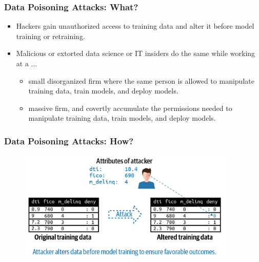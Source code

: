 \documentclass[11pt,
               aspectratio=169,
               hyperref={colorlinks}
               ]{beamer}
\begin{document}
			\begin{frame}
		
				\frametitle{Data Poisoning Attacks: \textbf{What?}}
				
				\begin{itemize}
					\item Hackers gain unauthorized access to training data and alter it before model training or retraining.
					\item Malicious or extorted data science or IT insiders do the same while working at a ...
					\begin{itemize}
						\item small disorganized firm where the same person is allowed to manipulate training data, train models, and deploy models.
						\item massive firm, and covertly accumulate the permissions needed to manipulate training data, train models, and deploy models.
					\end{itemize}
				\end{itemize}
			
			\end{frame}
			
			\begin{frame}
		
				\frametitle{Data Poisoning Attacks: \textbf{How?}}		
			
				\begin{figure}[htb]
					\begin{center}
						\includegraphics[height=150pt]{../img/poisoning.png}
					\end{center}
				\end{figure}
			
		
			\end{frame}
		
\end{document}
